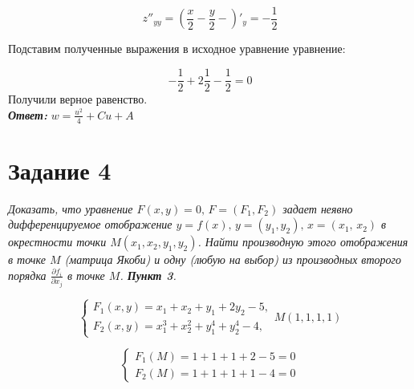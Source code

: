 \documentclass[a5paper, 10pt]{article}
\theoremstyle{definition}
\theoremstyle{plain}
\theoremstyle{remark}
\begin{document}
\begin{equation}
z''_{yy} = \left(  \frac{x}{2} - \frac{y}{2} - \right)'_y =  - \frac{ 1}{2}
\end{equation}

Подставим полученные выражения в исходное уравнение уравнение:

\begin{equation}
- \frac{ 1}{2} + 2\frac{ 1}{2} - \frac{ 1}{2} = 0
\end{equation}
Получили верное равенство.\\

\textit{\textbf{Ответ:}} $ w =  \frac{u^2}{4} + Cu + A $


\newpage

\section{Задание 4}
\textit{Доказать, что уравнение $F(x,y)=0, \, F=(F_1, F_2)$ задает неявно дифференцируемое отображение $y=f(x), \, y=(y_1, y_2), \, x = (x_1, \, x_2)$ в окрестности точки $M(x_1, x_2, y_1, y_2)$. Найти производную этого отображения в точке $M$ (матрица Якоби) и одну (любую на выбор) из производных второго порядка $\frac{\partial f_i}{\partial x_j}$ в точке $M$. \textbf{Пункт 3}.}

\begin{equation}
\begin{cases}
F_1 (x, y) = x_1 + x_2 + y_1 + 2y_2 -5,\\
F_2 (x, y) = x^3_1 + x^2_2 +y^4_1+y^4_2-4,
\end{cases}
M(1, 1, 1, 1)
\end{equation}



\begin{equation}
\begin{cases}
F_1(M) = 1 + 1 + 1 + 2 - 5 = 0\\
F_2(M) = 1 + 1 + 1 + 1 -4 = 0
\end{cases}
\end{equation}
\end{document}
